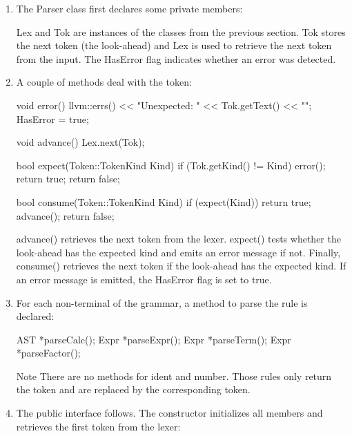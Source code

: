 \begin{enumerate}
\item
The Parser class first declares some private members:

\begin{cpp}
class Parser {
    Lexer &Lex;
    Token Tok;
    bool HasError;
\end{cpp}

Lex and Tok are instances of the classes from the previous section. Tok stores the next token (the look-ahead) and Lex is used to retrieve the next token from the input. The HasError flag indicates whether an error was detected.

\item
A couple of methods deal with the token:

\begin{cpp}
    void error() {
        llvm::errs() << "Unexpected: " << Tok.getText()
        << "\n";
        HasError = true;
    }

    void advance() { Lex.next(Tok); }

    bool expect(Token::TokenKind Kind) {
        if (Tok.getKind() != Kind) {
            error();
            return true;
        }
        return false;
    }

    bool consume(Token::TokenKind Kind) {
        if (expect(Kind))
            return true;
        advance();
        return false;
    }
\end{cpp}

advance() retrieves the next token from the lexer. expect() tests whether the look-ahead has the expected kind and emits an error message if not. Finally, consume() retrieves the next token if the look-ahead has the expected kind. If an error message is emitted, the HasError flag is set to true.

\item
For each non-terminal of the grammar, a method to parse the rule is declared:

\begin{cpp}
    AST *parseCalc();
    Expr *parseExpr();
    Expr *parseTerm();
    Expr *parseFactor();
\end{cpp}

\begin{myNotic}{Note}
There are no methods for ident and number. Those rules only return the token and are replaced by the corresponding token.
\end{myNotic}

\item
The public interface follows. The constructor initializes all members and retrieves the first token from the lexer:


\end{enumerate}
